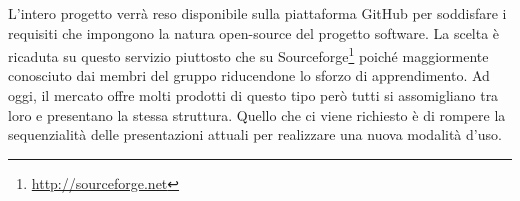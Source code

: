 L’intero progetto verrà reso disponibile sulla piattaforma GitHub per soddisfare i requisiti che impongono la natura open-source del progetto software.
La scelta è ricaduta su questo servizio piuttosto che su Sourceforge\footnote{\url{http://sourceforge.net}} poiché maggiormente conosciuto dai membri del gruppo riducendone lo sforzo di apprendimento.
Ad oggi, il mercato offre molti prodotti di questo tipo però tutti si assomigliano tra loro e presentano la stessa struttura. Quello che ci viene richiesto è di rompere la sequenzialità delle presentazioni attuali per realizzare una nuova modalità d’uso.